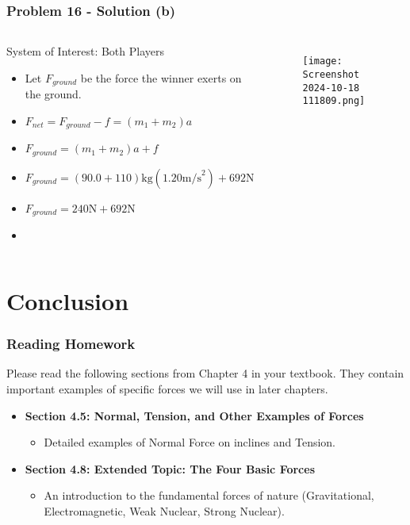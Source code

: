 \documentclass{beamer}
\begin{document}
\begin{frame}
\frametitle{Problem 16 - Solution (b)}
\begin{columns}[T]
        \begin{block}{System of Interest: Both Players}
            \begin{itemize}
                \item Let $F_{ground}$ be the force the winner exerts on the ground.
                \item $F_{net} = F_{ground} - f = (m_1+m_2)a$
                \item $F_{ground} = (m_1+m_2)a + f$
                \item $F_{ground} = (90.0+110)\text{kg}(1.20 \text{m/s}^2) + 692 \text{N}$
                \item $F_{ground} = 240 \text{N} + 692 \text{N}$
                \item {}
            \end{itemize}
        \end{block}
        \begin{figure}
            \centering
            \texttt{[image: Screenshot 2024-10-18 111809.png]}
        \end{figure}
\end{columns}
\end{frame}

\section{Conclusion}

\begin{frame}
\frametitle{Reading Homework}
Please read the following sections from Chapter 4 in your textbook. They contain important examples of specific forces we will use in later chapters.
\begin{itemize}
    \item \textbf{Section 4.5: Normal, Tension, and Other Examples of Forces}
    \begin{itemize}
        \item Detailed examples of Normal Force on inclines and Tension.
    \end{itemize}
    \pause
    \item \textbf{Section 4.8: Extended Topic: The Four Basic Forces}
    \begin{itemize}
        \item An introduction to the fundamental forces of nature (Gravitational, Electromagnetic, Weak Nuclear, Strong Nuclear).
    \end{itemize}
\end{itemize}
\end{frame}
\end{document}
